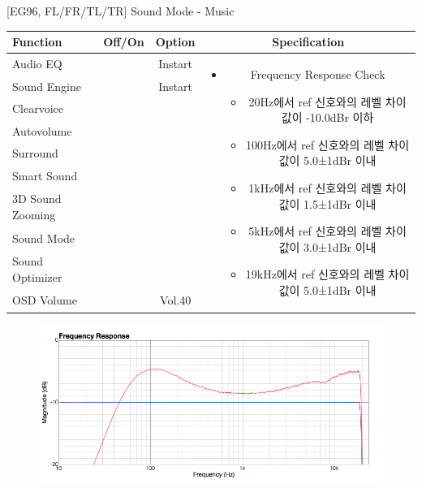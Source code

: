 \documentclass{beamer}
\begin{document}
\begin{frame}[t]{[EG96, FL/FR/TL/TR] Sound Mode - Music}
\begin{tiny}
\begin{tabular}{@{}lccc@{}}
\toprule
Function & Off/On & Option & Specification \\
\midrule
Audio EQ & \color{black}{Off} & Instart &
\multirow{10}{60mm}{
\begin{itemize}
\item Frequency Response Check
	\begin{itemize}
	\item 20Hz에서 ref 신호와의 레벨 차이값이 -10.0dBr 이하
	\item 100Hz에서 ref 신호와의 레벨 차이값이 5.0±1dBr 이내
	\item 1kHz에서 ref 신호와의 레벨 차이값이 1.5±1dBr 이내
	\item 5kHz에서 ref 신호와의 레벨 차이값이 3.0±1dBr 이내
	\item 19kHz에서 ref 신호와의 레벨 차이값이 5.0±1dBr 이내
	\end{itemize}
\end{itemize}
} \\
Sound Engine & \color{blue}{On} & Instart & \\
Clearvoice & \color{black}{Off} & & \\
Autovolume & \color{black}{Off} & & \\
Surround & \color{black}{Off} & & \\
Smart Sound & \color{black}{Off} & & \\
3D Sound Zooming & \color{black}{Off} & & \\
Sound Mode & \color{blue}{On} & \color{blue}{Music} & \\
Sound Optimizer & \color{black}{Off} & & \\
OSD Volume & \color{blue}{On} & Vol.40 & \\
\midrule
\end{tabular}
\end{tiny}

\begin{figure}[b]
\includegraphics[height=0.4\textwidth]{figure/EG96/music.png}
\end{figure}

\end{frame}
\end{document}
